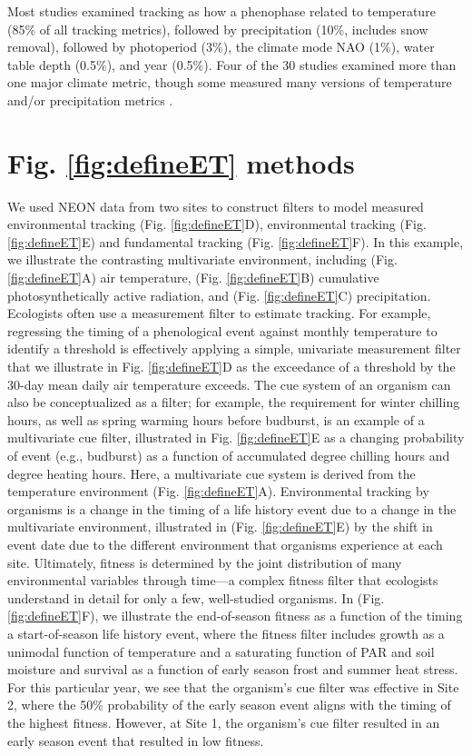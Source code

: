 \documentclass[11pt,letter]{article}
\begin{document}
Most studies examined tracking as how a phenophase related to temperature (85\% of all tracking metrics), followed by precipitation (10\%, includes snow removal), followed by photoperiod (3\%), the climate mode NAO (1\%), water table depth (0.5\%), and year (0.5\%). Four of the 30 studies examined more than one major climate metric, though some measured many versions of temperature and/or precipitation metrics \citep[e.g., 15 precipitation and/or temperature metrics considered in][]{munson2017}.

\section{Fig. \ref{fig:defineET} methods}
We used NEON data from two sites to construct filters to model measured environmental tracking (Fig. \ref{fig:defineET}D), environmental tracking (Fig. \ref{fig:defineET}E) and fundamental tracking (Fig. \ref{fig:defineET}F). In this example, we illustrate the contrasting multivariate environment, including (Fig. \ref{fig:defineET}A) air temperature, (Fig. \ref{fig:defineET}B) cumulative photosynthetically active radiation, and (Fig. \ref{fig:defineET}C) precipitation.  Ecologists often use a measurement filter to estimate tracking.  For example, regressing the timing of a phenological event against monthly temperature to identify a threshold is effectively applying a simple, univariate measurement filter that we illustrate in Fig. \ref{fig:defineET}D as the exceedance of a threshold by the 30-day mean daily air temperature exceeds.  The cue system of an organism can also be conceptualized as a filter; for example, the requirement for winter chilling hours, as well as spring warming hours before budburst, is an example of a multivariate cue filter, illustrated in Fig. \ref{fig:defineET}E as a changing probability of event (e.g., budburst) as a function of accumulated degree chilling hours and degree heating hours.  Here, a multivariate cue system is derived from the temperature environment (Fig. \ref{fig:defineET}A).  Environmental tracking by organisms is a change in the timing of a life history event due to a change in the multivariate environment, illustrated in (Fig. \ref{fig:defineET}E) by the shift in event date due to the different environment that organisms experience at each site.   Ultimately, fitness is determined by the joint distribution of many environmental variables through time---a complex fitness filter that ecologists understand in detail for only a few, well-studied organisms.  In (Fig. \ref{fig:defineET}F), we illustrate the end-of-season fitness as a function of the timing a start-of-season life history event, where the fitness filter includes growth as a unimodal function of temperature and a saturating function of PAR and soil moisture and survival as a function of early season frost and summer heat stress.  For this particular year, we see that the organism's cue filter was effective in Site 2, where the 50\% probability of the early season event aligns with the timing of the highest fitness.  However, at Site 1, the organism's cue filter resulted in an early season event that resulted in low fitness.   %
\end{document}
